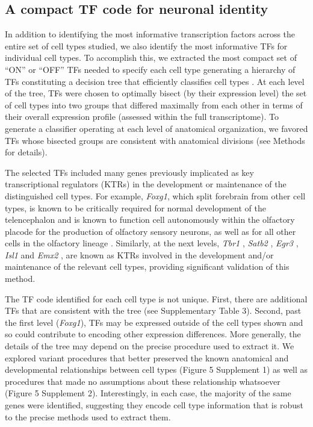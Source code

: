 \subsection{A compact TF code for neuronal identity}
In addition to identifying the most informative transcription factors across the entire set of cell types studied, we also identify the most informative TFs for individual cell types. To accomplish this, we extracted the most compact set of “ON” or “OFF” TFs needed to specify each cell type generating a hierarchy of TFs constituting a decision tree  \citep{Saeys_2007} that efficiently classifies cell types \citep{Gabitto_2016}. At each level of the tree, TFs were chosen to optimally bisect (by their expression level) the set of cell types into two groups that differed maximally from each other in terms of their overall expression profile (assessed within the full transcriptome). To generate a classifier operating at each level of anatomical organization, we favored TFs whose bisected groups are consistent with anatomical divisions (see Methods for details).

The selected TFs included many genes previously implicated as key transcriptional regulators (KTRs) in the development or maintenance of the distinguished cell types. For example, \textit{Foxg1}, which split forebrain from other cell types, is known to be critically required for normal development of the telencephalon \citep{Xuan_1995, Danesin_2012} and is known to function cell autonomously within the olfactory placode for the production of olfactory sensory neurons, as well as for all other cells in the olfactory lineage \citep{Duggan_2008}. 
Similarly, at the next levels, \textit{Tbr1} \citep{Bedogni_2010}, \textit{Satb2} \cite{Leone_2014}, \textit{Egr3} \citep{Chandra_2015}, \textit{Isl1} \citep{Lu_2013} and \textit{Emx2} \citep{Zhang_2016}, are known as KTRs involved in the development and/or maintenance of the relevant cell types, providing significant validation of this method.

The TF code identified for each cell type is not unique. First, there are additional TFs that are consistent with the tree (see Supplementary Table 3). Second, past the first level (\textit{Foxg1}), TFs may be expressed outside of the cell types shown and so could contribute to encoding other expression differences. More generally, the details of the tree may depend on the precise procedure used to extract it. We explored variant procedures that better preserved the known anatomical and developmental relationships between cell types (Figure 5 Supplement 1) as well as procedures that made no assumptions about these relationship whatsoever (Figure 5 Supplement 2). Interestingly, in each case, the majority of the same genes were identified, suggesting they encode cell type information that is robust to the precise methods used to extract them.

